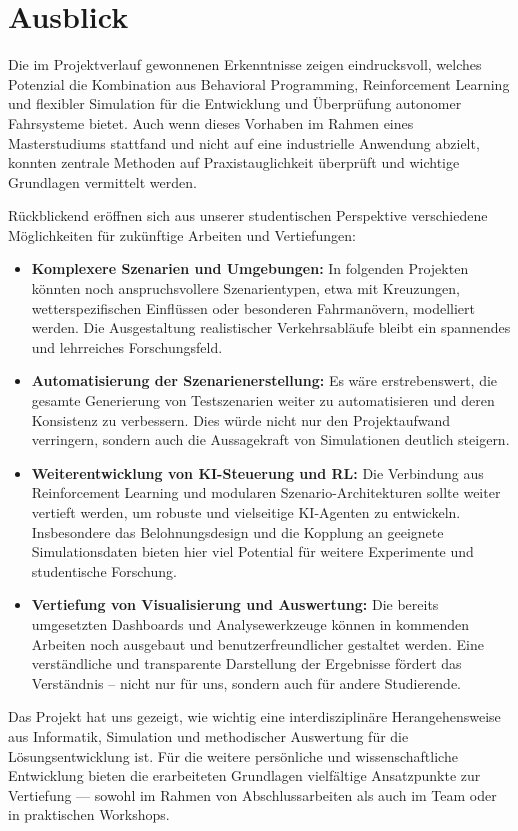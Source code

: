 \chapter{Ausblick}

Die im Projektverlauf gewonnenen Erkenntnisse zeigen eindrucksvoll, welches Potenzial die Kombination aus Behavioral Programming, Reinforcement Learning und flexibler Simulation für die Entwicklung und Überprüfung autonomer Fahrsysteme bietet\cite{EinfuehrungIntegrationsprojekt}. Auch wenn dieses Vorhaben im Rahmen eines Masterstudiums stattfand und nicht auf eine industrielle Anwendung abzielt, konnten zentrale Methoden auf Praxistauglichkeit überprüft und wichtige Grundlagen vermittelt werden.

Rückblickend eröffnen sich aus unserer studentischen Perspektive verschiedene Möglichkeiten für zukünftige Arbeiten und Vertiefungen:
\begin{itemize}
    \item \textbf{Komplexere Szenarien und Umgebungen:} In folgenden Projekten könnten noch anspruchsvollere Szenarientypen, etwa mit Kreuzungen, wetterspezifischen Einflüssen oder besonderen Fahrmanövern, modelliert werden. Die Ausgestaltung realistischer Verkehrsabläufe bleibt ein spannendes und lehrreiches Forschungsfeld.
    \item \textbf{Automatisierung der Szenarienerstellung:} Es wäre erstrebenswert, die gesamte Generierung von Testszenarien weiter zu automatisieren und deren Konsistenz zu verbessern. Dies würde nicht nur den Projektaufwand verringern, sondern auch die Aussagekraft von Simulationen deutlich steigern.
    \item \textbf{Weiterentwicklung von KI-Steuerung und RL:} Die Verbindung aus Reinforcement Learning und modularen Szenario-Architekturen sollte weiter vertieft werden, um robuste und vielseitige KI-Agenten zu entwickeln. Insbesondere das Belohnungsdesign und die Kopplung an geeignete Simulationsdaten bieten hier viel Potential für weitere Experimente und studentische Forschung.
    \item \textbf{Vertiefung von Visualisierung und Auswertung:} Die bereits umgesetzten Dashboards und Analysewerkzeuge können in kommenden Arbeiten noch ausgebaut und benutzerfreundlicher gestaltet werden. Eine verständliche und transparente Darstellung der Ergebnisse fördert das Verständnis – nicht nur für uns, sondern auch für andere Studierende.
\end{itemize}

Das Projekt hat uns gezeigt, wie wichtig eine interdisziplinäre Herangehensweise aus Informatik, Simulation und methodischer Auswertung für die Lösungsentwicklung ist. Für die weitere persönliche und wissenschaftliche Entwicklung bieten die erarbeiteten Grundlagen vielfältige Ansatzpunkte zur Vertiefung — sowohl im Rahmen von Abschlussarbeiten als auch im Team oder in praktischen Workshops.
